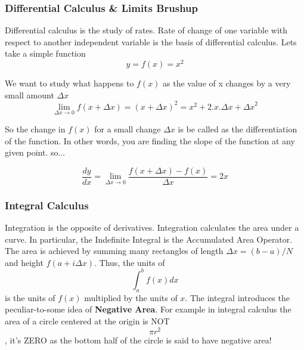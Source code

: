 \documentclass[10pt]{beamer}
\begin{document}
\begin{frame}
	\frametitle{Differential Calculus \& Limits Brushup}
	
Differential calculus is the study of rates. Rate of change of one variable with respect to another independent variable is the basis of differential calculus. Lets take a simple function $$y = f(x)= x^2$$

We want to study what happens to $f(x)$ as the value of x changes by a very small amount $\Delta x$
 $$\lim_{\Delta x \to 0} f(x+\Delta x) = (x+ \Delta x)^2 = x^2 +2.x.\Delta x +{\Delta x}^2$$
 
 So the change in $f(x)$ for a small change $\Delta x$ is be called as the differentiation of the function.  In other words, you are finding the slope of the function at any given point. so...
 
$$\frac{dy}{dx} = \lim_{\Delta x \to 0} \frac{f(x+\Delta x) -f(x)}{\Delta x} = 2x$$

\end{frame}

\begin{frame}
	\frametitle{Integral Calculus}
Integration is the opposite of derivatives. Integration calculates the area under a curve. In particular, the Indefinite Integral is the Accumulated Area Operator.  The area is
achieved by summing many rectangles of length $\Delta x = (b-a)/N$ and height
$f(a+i\Delta x )$.  Thus, the units of $$\int_a^b f(x) dx$$ is the units of $f(x)$ multiplied
by the units of $x$.  The integral introduces the peculiar-to-some idea of {\bf Negative Area}.  For example in integral calculus the area of a circle centered at the origin is NOT $$\pi r^2$$, it's ZERO as the bottom half of the circle is said to have negative area!	
\end{frame}
\end{document}
